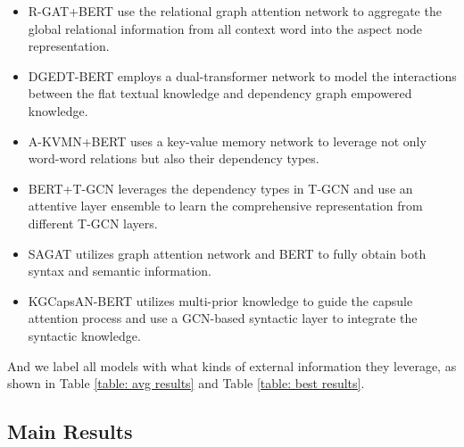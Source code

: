   \begin{itemize}
 \item R-GAT+BERT \cite{RGAT} use the relational graph attention network to aggregate the global relational information from all context word into the aspect node representation.
 \item  DGEDT-BERT \cite{DGEDT} employs a dual-transformer network to model the interactions between the flat textual knowledge and dependency graph empowered knowledge. 
 \item A-KVMN+BERT \cite{kvmn-eacl} uses a key-value memory network to leverage not only word-word relations but also their dependency types.
 \item BERT+T-GCN \cite{tgcn} leverages the dependency types in T-GCN and use an attentive layer ensemble to learn the comprehensive representation from different T-GCN layers.
 \item SAGAT \cite{sagat} utilizes graph attention network and BERT to fully obtain both syntax and semantic information.
 \item KGCapsAN-BERT \cite{kgcap} utilizes multi-prior knowledge to guide the capsule attention process and use a GCN-based syntactic layer to integrate the syntactic knowledge.
\end{itemize}

And we label all models with what kinds of external information they leverage, as shown in Table \ref{table: avg results} and Table \ref{table: best results}.



\subsection{Main Results}

